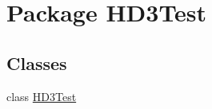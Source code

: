 \hypertarget{namespace_h_d3_test}{\section{Package H\+D3\+Test}
\label{namespace_h_d3_test}
}
\subsection*{Classes}
\begin{DoxyCompactItemize}
\item 
class \hyperlink{class_h_d3_test_1_1_h_d3_test}{H\+D3\+Test}
\end{DoxyCompactItemize}
